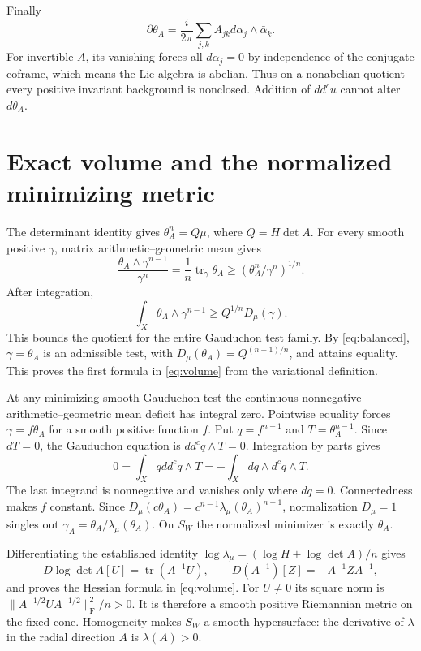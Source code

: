 \documentclass[11pt]{article}
\newcommand{\ddc}{dd^c}
\newcommand{\tr}{\operatorname{tr}}
\newcommand{\Frob}{\mathrm F}
\begin{document}
Finally
\[
 \partial\theta_A=\frac{i}{2\pi}\sum_{j,k}A_{jk}
                                  d\alpha_j\wedge\bar\alpha_k.
\]
For invertible $A$, its vanishing forces all $d\alpha_j=0$ by independence
of the conjugate coframe, which means the Lie algebra is abelian.
Thus on a nonabelian quotient every positive invariant background is
nonclosed. Addition of $\ddc u$ cannot alter $d\theta_A$.

\section{Exact volume and the normalized minimizing metric}
The determinant identity gives $\theta_A^n=Q\mu$, where $Q=H\det A$.
For every smooth positive $\gamma$, matrix arithmetic--geometric mean gives
\[
 \frac{\theta_A\wedge\gamma^{n-1}}{\gamma^n}
 =\frac1n\tr_\gamma\theta_A
 \geq(\theta_A^n/\gamma^n)^{1/n}.
\]
After integration,
\[
 \int_X\theta_A\wedge\gamma^{n-1}\geq Q^{1/n}D_\mu(\gamma).
\]
This bounds the quotient for the entire Gauduchon test family.
By \eqref{eq:balanced}, $\gamma=\theta_A$ is an admissible test, with
$D_\mu(\theta_A)=Q^{(n-1)/n}$, and attains equality. This proves
the first formula in \eqref{eq:volume} from the variational definition.

At any minimizing smooth Gauduchon test the continuous nonnegative
arithmetic--geometric mean deficit has integral zero. Pointwise equality
forces $\gamma=f\theta_A$ for a smooth positive function $f$.
Put $q=f^{n-1}$ and $T=\theta_A^{n-1}$. Since $dT=0$, the Gauduchon
equation is $\ddc q\wedge T=0$. Integration by parts gives
\[
 0=\int_Xq\ddc q\wedge T=-\int_Xdq\wedge d^cq\wedge T.
\]
The last integrand is nonnegative and vanishes only where $dq=0$.
Connectedness makes $f$ constant. Since
$D_\mu(c\theta_A)=c^{n-1}\lambda_\mu(\theta_A)^{n-1}$,
normalization $D_\mu=1$ singles out $\gamma_A=\theta_A/\lambda_\mu(\theta_A)$.
On $S_W$ the normalized minimizer is exactly $\theta_A$.

Differentiating the established identity
$\log\lambda_\mu=(\log H+\log\det A)/n$ gives
\[
 D\log\det A[U]=\tr(A^{-1}U),\qquad
 D(A^{-1})[Z]=-A^{-1}ZA^{-1},
\]
and proves the Hessian formula in \eqref{eq:volume}.
For $U\ne0$ its square norm is
$\|A^{-1/2}UA^{-1/2}\|_\Frob^2/n>0$.
It is therefore a smooth positive Riemannian metric on the fixed cone.
Homogeneity makes $S_W$ a smooth hypersurface: the derivative of
$\lambda$ in the radial direction $A$ is $\lambda(A)>0$.
\end{document}
